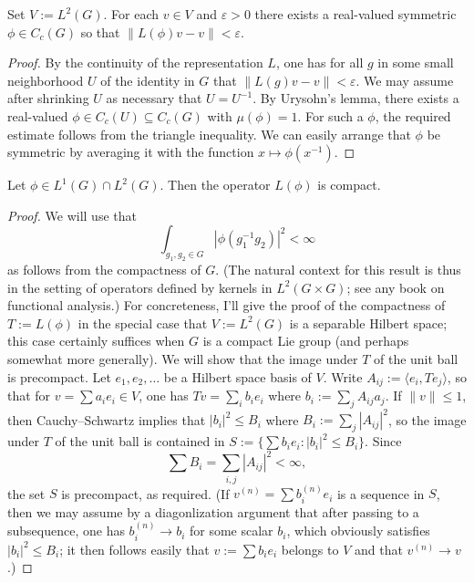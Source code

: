 \documentclass[reqno]{amsart} 
\def\eps{\varepsilon}
\begin{document}
\begin{lemma}\label{lem:approximate-vectors-by-convolutions}
  Set $V := L^2(G)$.
  For each $v \in V$ and $\eps > 0$
  there exists a real-valued symmetric $\phi \in C_c(G)$ so that
  $\|L(\phi) v - v \| < \eps$.
\end{lemma}
\begin{proof}
  By the continuity of the representation $L$,
  one has for all $g$ in some small neighborhood
  $U$ of the identity
  in $G$ that $\|L(g) v - v \| < \eps$.
  We may assume after shrinking $U$ as necessary that $U = U^{-1}$.
  By Urysohn's lemma,
  there exists a real-valued $\phi \in C_c(U) \subseteq C_c(G)$
  with $\mu(\phi) = 1$.
  For such a $\phi$, the required estimate follows
  from the triangle inequality.
  We can easily arrange that $\phi$ be symmetric
  by averaging it with the function $x \mapsto \phi(x^{-1})$.
\end{proof}

\begin{lemma}
  Let $\phi \in L^1(G) \cap L^2(G)$.
  Then the operator $L(\phi)$ is compact.
\end{lemma}
\begin{proof}
  We will use that
  \begin{equation}\label{eq:kernel-is-integrable}
    \int_{g_1,g_2 \in G}
    |\phi(g_1^{-1} g_2)|^2 < \infty
  \end{equation}
  as follows from the compactness of $G$.
  (The natural context for this result is thus
  in the setting of operators defined by kernels
  in $L^2(G \times G)$; see any book on functional analysis.)
  For concreteness, I'll give the proof
  of the compactness of $T := L(\phi)$ in the special case that
  $V := L^2(G)$
  is a separable Hilbert space; this case certainly suffices
  when $G$ is a compact Lie group (and perhaps somewhat more
  generally).
  We will show that the image under $T$ of the unit ball
  is precompact.
  Let $e_1,e_2,\dotsc$ be a Hilbert space basis of $V$.
  Write $A_{i j} := \langle e_i, T e_j \rangle$,
  so that for $v = \sum a_i e_i \in V$,
  one has $T v =
  \sum_{i} b_i e_i$
  where $b_i := \sum_j A_{i j} a_j$.
  If $\|v\| \leq 1$,
  then Cauchy--Schwartz
  implies that $|b_i|^2 \leq B_i$ where $B_i := \sum_{j} |A_{i
    j}|^2$,
  so
  the image under $T$ of the unit ball
  is contained in $S := \{\sum b_i e_i : |b_i|^2 \leq B_i\}$.
  Since
  \begin{equation*}
    \sum B_i =  \sum_{i,j} |A_{i j}|^2 < \infty,
  \end{equation*}
  the set $S$ is precompact, as required.
  (If $v^{(n)} = \sum b_i^{(n)} e_i$ is a sequence in $S$,
  then we may assume by a diagonlization argument
  that after passing to a subsequence,
  one has $b_i^{(n)} \rightarrow b_i$ for some scalar $b_i$,
  which obviously satisfies $|b_i|^2 \leq B_i$;
  it then follows easily
  that $v := \sum b_i e_i$ belongs to $V$
  and that $v^{(n)} \rightarrow v$.)
\end{proof}
\end{document}
